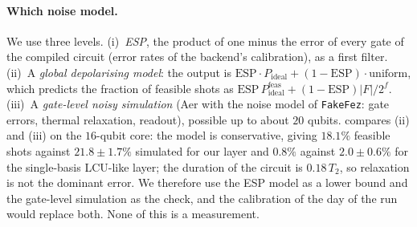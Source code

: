 \paragraph{Which noise model.} We use three levels. (i)~\emph{ESP}, the product of one minus the error of every gate of the compiled circuit (error rates of the backend's calibration), as a first filter. (ii)~A \emph{global depolarising model}: the output is $\mathrm{ESP}\cdot P_\mathrm{ideal}+(1-\mathrm{ESP})\cdot\mathrm{uniform}$, which predicts the fraction of feasible shots as $\mathrm{ESP}\,P_\mathrm{ideal}^{\mathrm{feas}}+(1-\mathrm{ESP})|F|/2^f$. (iii)~A \emph{gate-level noisy simulation} (Aer with the noise model of \texttt{FakeFez}: gate errors, thermal relaxation, readout), possible up to about $20$ qubits.  compares (ii) and (iii) on the $16$-qubit core: the model is conservative, giving $18.1\%$ feasible shots against $21.8\pm1.7\%$ simulated for our layer and $0.8\%$ against $2.0\pm0.6\%$ for the single-basis LCU-like layer; the duration of the circuit is $0.18\,T_2$, so relaxation is not the dominant error. We therefore use the ESP model as a lower bound and the gate-level simulation as the check, and the calibration of the day of the run would replace both. None of this is a measurement.



